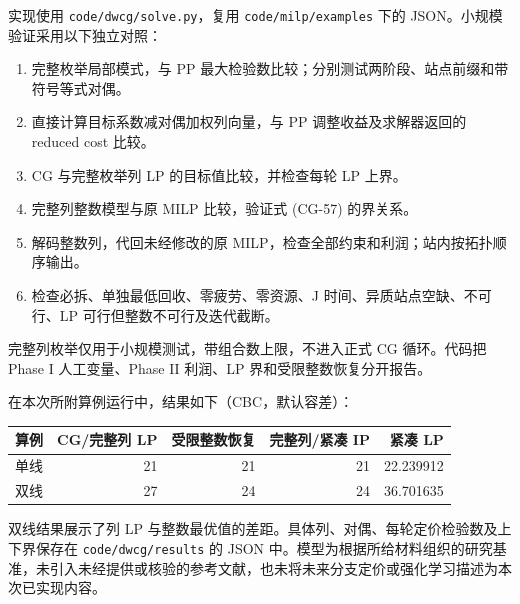 \documentclass[UTF8,a4paper,11pt]{ctexart}
\begin{document}
实现使用 \texttt{code/dwcg/solve.py}，复用 \texttt{code/milp/examples} 下的 JSON。小规模验证采用以下独立对照：
\begin{enumerate}
\item 完整枚举局部模式，与 PP 最大检验数比较；分别测试两阶段、站点前缀和带符号等式对偶。
\item 直接计算目标系数减对偶加权列向量，与 PP 调整收益及求解器返回的 reduced cost 比较。
\item CG 与完整枚举列 LP 的目标值比较，并检查每轮 LP 上界。
\item 完整列整数模型与原 MILP 比较，验证式 (CG-57) 的界关系。
\item 解码整数列，代回未经修改的原 MILP，检查全部约束和利润；站内按拓扑顺序输出。
\item 检查必拆、单独最低回收、零疲劳、零资源、J 时间、异质站点空缺、不可行、LP 可行但整数不可行及迭代截断。
\end{enumerate}
完整列枚举仅用于小规模测试，带组合数上限，不进入正式 CG 循环。代码把 Phase I 人工变量、Phase II 利润、LP 界和受限整数恢复分开报告。

在本次所附算例运行中，结果如下（CBC，默认容差）：
\begin{center}\begin{tabular}{lrrrr}
\toprule 算例 & CG/完整列 LP & 受限整数恢复 & 完整列/紧凑 IP & 紧凑 LP\\\midrule
单线 & 21 & 21 & 21 & 22.239912\\
双线 & 27 & 24 & 24 & 36.701635\\\bottomrule
\end{tabular}\end{center}
双线结果展示了列 LP 与整数最优值的差距。具体列、对偶、每轮定价检验数及上下界保存在 \texttt{code/dwcg/results} 的 JSON 中。模型为根据所给材料组织的研究基准，未引入未经提供或核验的参考文献，也未将未来分支定价或强化学习描述为本次已实现内容。
\end{document}
